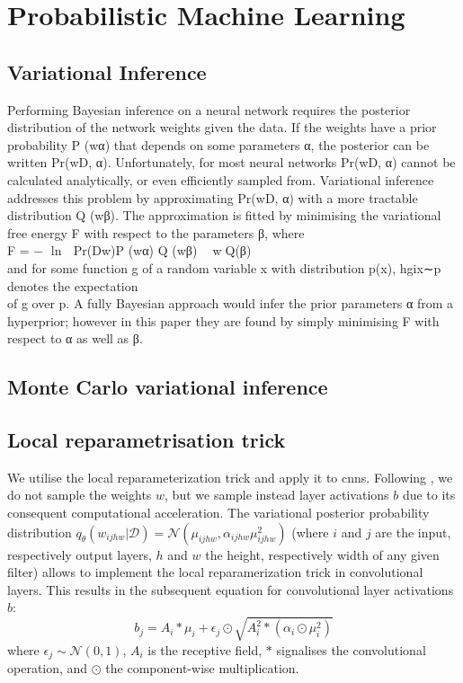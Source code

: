 \section{Probabilistic Machine Learning}
\subsection{Variational Inference}

Performing Bayesian inference on a neural network requires the posterior distribution of the network weights given the data. If the weights have a prior probability P (w\textbar{}α) that depends on some parameters α, the posterior can be written Pr(w\textbar{}D, α). Unfortunately, for most neural networks Pr(w\textbar{}D, α) cannot be calculated analytically, or even efficiently sampled from. Variational inference addresses this problem by approximating Pr(w\textbar{}D, α) with a more tractable distribution Q (w\textbar{}β). The approximation is fitted by minimising the variational free energy F with respect to the parameters
β, where\\ 
F = − ln  Pr(D\textbar{}w)P (w\textbar{}α) Q (w\textbar{}β) 
w∼Q(β)\\
and for some function g of a random variable x with distribution p(x),
hgix∼p denotes the expectation\\
of g over p. A fully Bayesian approach would infer the prior parameters
α from a hyperprior; however in this paper they are found by simply
minimising F with respect to α as well as β.

\subsection{Monte  Carlo  variational  inference}
\subsection{Local  reparametrisation  trick}

We utilise the local reparameterization trick \cite{kingma2015variational} and apply it to \acp{cnn}. Following \cite{kingma2015variational,neklyudov2018variance}, we do not sample the weights $w$, but we sample instead layer activations $b$ due to its consequent computational acceleration. The variational posterior probability distribution $q_{\theta}(w_{ijhw}|\mathcal{D})=\mathcal{N}(\mu_{ijhw},\alpha_{ijhw}\mu^2_{ijhw})$ (where $i$ and $j$ are the input, respectively output layers, $h$ and $w$ the height, respectively width of any given filter) allows to implement the local reparamerization trick in convolutional layers. This results in the subsequent equation for convolutional layer activations $b$:
\begin{equation}
    b_j=A_i\ast \mu_i+\epsilon_j\odot \sqrt{A^2_i\ast (\alpha_i\odot \mu^2_i)}
\end{equation}
where $\epsilon_j \sim \mathcal{N}(0,1)$, $A_i$ is the receptive field, $\ast$ signalises the convolutional operation, and $\odot$ the component-wise multiplication.

